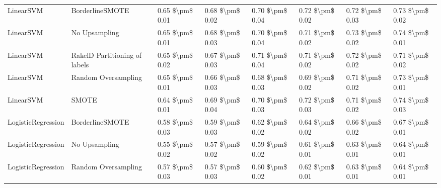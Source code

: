 \begin{tabular}{llllllll}
                      LinearSVM &               BorderlineSMOTE &     0.65 \$\textbackslash pm\$ 0.01 &           0.68 \$\textbackslash pm\$ 0.02 &       0.70 \$\textbackslash pm\$ 0.04 &        0.72 \$\textbackslash pm\$ 0.02 &                         0.72 \$\textbackslash pm\$ 0.03 &     0.73 \$\textbackslash pm\$ 0.02 \\
                      LinearSVM &                 No Upsampling &     0.65 \$\textbackslash pm\$ 0.01 &           0.68 \$\textbackslash pm\$ 0.03 &       0.70 \$\textbackslash pm\$ 0.04 &        0.71 \$\textbackslash pm\$ 0.02 &                         0.73 \$\textbackslash pm\$ 0.02 &     0.74 \$\textbackslash pm\$ 0.01 \\
                      LinearSVM & RakelD Partitioning of labels &     0.65 \$\textbackslash pm\$ 0.02 &           0.67 \$\textbackslash pm\$ 0.03 &       0.71 \$\textbackslash pm\$ 0.04 &        0.71 \$\textbackslash pm\$ 0.02 &                         0.72 \$\textbackslash pm\$ 0.02 &     0.71 \$\textbackslash pm\$ 0.02 \\
                      LinearSVM &           Random Oversampling &     0.65 \$\textbackslash pm\$ 0.01 &           0.66 \$\textbackslash pm\$ 0.03 &       0.68 \$\textbackslash pm\$ 0.03 &        0.69 \$\textbackslash pm\$ 0.02 &                         0.71 \$\textbackslash pm\$ 0.02 &     0.73 \$\textbackslash pm\$ 0.01 \\
                      LinearSVM &                         SMOTE &     0.64 \$\textbackslash pm\$ 0.01 &           0.69 \$\textbackslash pm\$ 0.04 &       0.70 \$\textbackslash pm\$ 0.03 &        0.72 \$\textbackslash pm\$ 0.03 &                         0.71 \$\textbackslash pm\$ 0.02 &     0.74 \$\textbackslash pm\$ 0.03 \\
             LogisticRegression &               BorderlineSMOTE &     0.58 \$\textbackslash pm\$ 0.03 &           0.59 \$\textbackslash pm\$ 0.03 &       0.62 \$\textbackslash pm\$ 0.02 &        0.64 \$\textbackslash pm\$ 0.02 &                         0.66 \$\textbackslash pm\$ 0.02 &     0.67 \$\textbackslash pm\$ 0.01 \\
             LogisticRegression &                 No Upsampling &     0.55 \$\textbackslash pm\$ 0.02 &           0.57 \$\textbackslash pm\$ 0.02 &       0.59 \$\textbackslash pm\$ 0.02 &        0.61 \$\textbackslash pm\$ 0.01 &                         0.63 \$\textbackslash pm\$ 0.01 &     0.64 \$\textbackslash pm\$ 0.01 \\
             LogisticRegression &           Random Oversampling &     0.57 \$\textbackslash pm\$ 0.03 &           0.57 \$\textbackslash pm\$ 0.03 &       0.60 \$\textbackslash pm\$ 0.02 &        0.62 \$\textbackslash pm\$ 0.01 &                         0.63 \$\textbackslash pm\$ 0.01 &     0.64 \$\textbackslash pm\$ 0.01 \\

\end{tabular}
